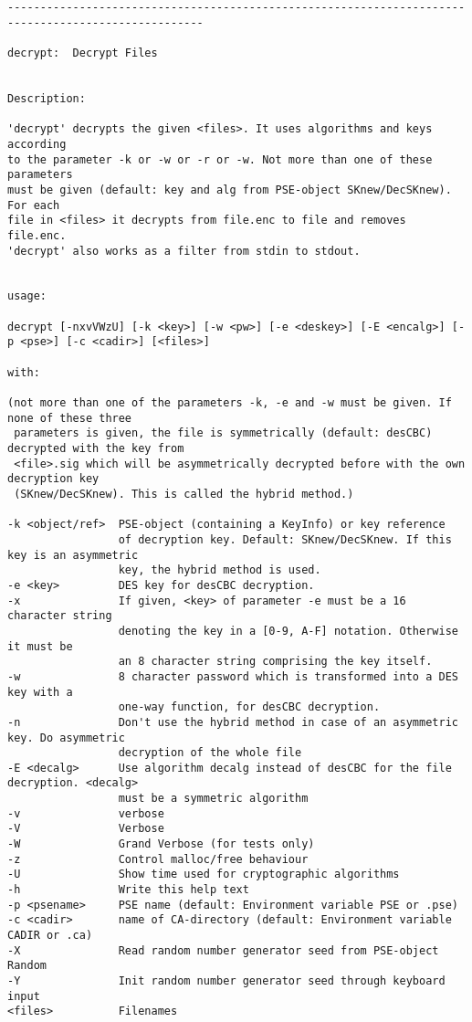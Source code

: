{\begin{verbatim}
----------------------------------------------------------------------------------------------------

decrypt:  Decrypt Files


Description:

'decrypt' decrypts the given <files>. It uses algorithms and keys according
to the parameter -k or -w or -r or -w. Not more than one of these parameters
must be given (default: key and alg from PSE-object SKnew/DecSKnew). For each
file in <files> it decrypts from file.enc to file and removes file.enc.
'decrypt' also works as a filter from stdin to stdout.


usage:

decrypt [-nxvVWzU] [-k <key>] [-w <pw>] [-e <deskey>] [-E <encalg>] [-p <pse>] [-c <cadir>] [<files>]

with:

(not more than one of the parameters -k, -e and -w must be given. If none of these three
 parameters is given, the file is symmetrically (default: desCBC) decrypted with the key from 
 <file>.sig which will be asymmetrically decrypted before with the own decryption key
 (SKnew/DecSKnew). This is called the hybrid method.)

-k <object/ref>  PSE-object (containing a KeyInfo) or key reference 
                 of decryption key. Default: SKnew/DecSKnew. If this key is an asymmetric
                 key, the hybrid method is used.
-e <key>         DES key for desCBC decryption.
-x               If given, <key> of parameter -e must be a 16 character string
                 denoting the key in a [0-9, A-F] notation. Otherwise it must be
                 an 8 character string comprising the key itself.
-w               8 character password which is transformed into a DES key with a
                 one-way function, for desCBC decryption.
-n               Don't use the hybrid method in case of an asymmetric key. Do asymmetric
                 decryption of the whole file
-E <decalg>      Use algorithm decalg instead of desCBC for the file decryption. <decalg>
                 must be a symmetric algorithm
-v               verbose
-V               Verbose
-W               Grand Verbose (for tests only)
-z               Control malloc/free behaviour
-U               Show time used for cryptographic algorithms
-h               Write this help text
-p <psename>     PSE name (default: Environment variable PSE or .pse)
-c <cadir>       name of CA-directory (default: Environment variable CADIR or .ca)
-X               Read random number generator seed from PSE-object Random
-Y               Init random number generator seed through keyboard input
<files>          Filenames


\end{verbatim}}
